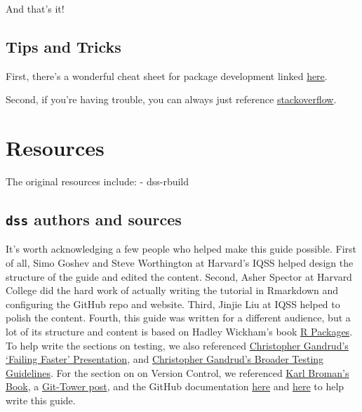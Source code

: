 \documentclass[
]{book}
\begin{document}
And that's it!

\hypertarget{tips-and-tricks-1}{%
\section{Tips and Tricks}\label{tips-and-tricks-1}}

First, there's a wonderful cheat sheet for package development linked \href{https://www.rstudio.com/wp-content/uploads/2015/06/devtools-cheatsheet.pdf}{here}.

Second, if you're having trouble, you can always just reference \href{https://stackoverflow.com/questions/tagged/r}{stackoverflow}.

\hypertarget{resources}{%
\chapter{Resources}\label{resources}}

The original resources include:
- dss-rbuild

\hypertarget{dss-authors-and-sources}{%
\section{\texorpdfstring{\texttt{dss} authors and sources}{dss authors and sources}}\label{dss-authors-and-sources}}

It's worth acknowledging a few people who helped make this guide possible. First of all, Simo Goshev and Steve Worthington at Harvard's IQSS helped design the structure of the guide and edited the content. Second, Asher Spector at Harvard College did the hard work of actually writing the tutorial in Rmarkdown and configuring the GitHub repo and website. Third, Jinjie Liu at IQSS helped to polish the content. Fourth, this guide was written for a different audience, but a lot of its structure and content is based on Hadley Wickham's book \href{http://r-pkgs.had.co.nz/}{R Packages}. To help write the sections on testing, we also referenced \href{http://slides.com/christophergandrud/failing-faster\#/24}{Christopher Gandrud's `Failing Faster' Presentation}, and \href{https://github.com/IQSS/social_science_software_toolkit/blob/master/testing/recommended_testing_tools_R.md\#recommended-testing-tools-and-process-for-r-packages}{Christopher Gandrud's Broader Testing Guidelines}. For the section on on Version Control, we referenced \href{https://kbroman.org/github_tutorial/}{Karl Broman's Book}, a \href{https://www.git-tower.com/learn/git/faq/restore-repo-to-previous-revision}{Git-Tower post}, and the GitHub documentation \href{https://git-scm.com/book/en/v2/Getting-Started-Git-Basics}{here} and \href{https://git-scm.com/book/en/v2/Getting-Started-First-Time-Git-Setup}{here} to help write this guide.
\end{document}
